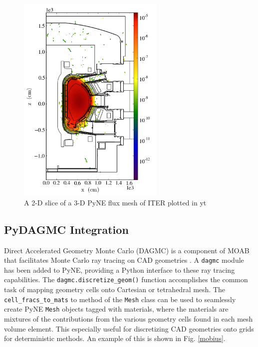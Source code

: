 \documentclass{anstrans}
\begin{document}
\begin{figure}
    \centering
    \includegraphics[width=7.0cm, angle =0]{flux_slice.png}
    \caption{A 2-D slice of a 3-D PyNE flux mesh of ITER plotted in yt}
    \label{ITER}
\end{figure}


\subsection{PyDAGMC Integration}

Direct Accelerated Geometry Monte Carlo (DAGMC) is a component of MOAB that
facilitates Monte Carlo ray tracing on CAD geometries
\cite{tautges_acceleration_2009}.  A \texttt{dagmc} module has been added to
PyNE, providing a Python interface to these ray tracing capabilities. The
\texttt{dagmc.discretize\_geom()} function accomplishes the common task of
mapping geometry cells onto Cartesian or tetrahedral mesh. The
\texttt{cell\_fracs\_to\_mats} to method of the \texttt{Mesh} class can be used
to seamlessly create PyNE \texttt{Mesh} objects tagged with materials, where
the materials are mixtures of the contributions from the various geometry cells
found in each mesh volume element. This especially useful for discretizing CAD
geometries onto grids for deterministic methods. An example of this is shown in
Fig. \ref{mobius}.
\end{document}

